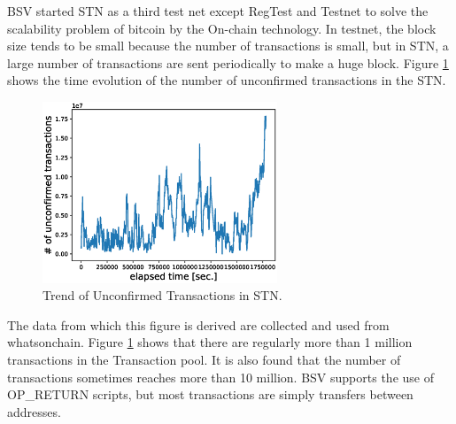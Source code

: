 \documentclass[graybox]{svmult}
\begin{document}
BSV started STN as a third test net except RegTest and Testnet to solve the scalability problem of bitcoin by the On-chain technology.
In testnet, the block size tends to be small because the number of transactions is small, but in STN, a large number of transactions are sent periodically to make a huge block.
Figure \ref{fig:unconfirmed_tx} shows the time evolution of the number of unconfirmed transactions in the STN.
%
\begin{figure}[t]
  \vspace{-35mm}
  \begin{center}
    \includegraphics[width=70mm]{time_vs_tx-plot.eps}
  \end{center}
  \vspace{35mm}
  \caption{Trend of Unconfirmed Transactions in STN.}
  \label{fig:unconfirmed_tx}
\end{figure}
%


The data from which this figure is derived are collected and used from whatsonchain\cite{woc}.
Figure \ref{fig:unconfirmed_tx} shows that there are regularly more than 1 million transactions in the Transaction pool. 
It is also found that the number of transactions sometimes reaches more than 10 million.
BSV supports the use of OP\_RETURN scripts, but most transactions are simply transfers between addresses.
\end{document}
